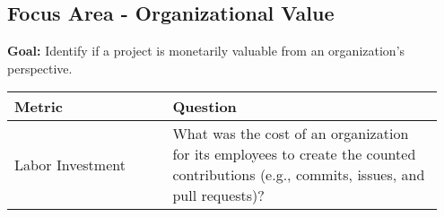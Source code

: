 
\subsection{Focus Area - Organizational Value}
\textbf{Goal:} Identify if a project is monetarily valuable from an organization's perspective.
\begin{table}[ht!]
    \centering
    \begin{tabular}{|p{0.35\linewidth} | p{0.6\linewidth}|}
        \hline
        \hfil \textbf{Metric}  & \hfil \textbf{Question} \\
        \hline
		Labor Investment & What was the cost of an organization for its employees to create the counted contributions (e.g., commits, issues, and pull requests)? \\ 
		\hline
    \end{tabular}
\end{table}

 
